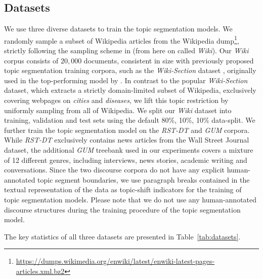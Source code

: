 \documentclass[letterpaper]{article} %
\begin{document}
\subsection{Datasets}
\label{sec:datasets}
We use three diverse datasets to train the topic segmentation models. We randomly sample a subset of Wikipedia articles from the Wikipedia dump\footnote{\url{https://dumps.wikimedia.org/enwiki/latest/enwiki-latest-pages-articles.xml.bz2}}, strictly following the sampling scheme in \citet{koshorek-etal-2018-text} (from here on called \textit{Wiki}). Our \textit{Wiki} corpus consists of $20,000$ documents, consistent in size with previously proposed topic segmentation training corpora, such as the \textit{Wiki-Section} dataset \cite{arnold-etal-2019-sector}, originally used in the top-performing model by \citet{xing-etal-2020-improving}. In contrast to the popular \textit{Wiki-Section} dataset, which extracts a strictly domain-limited subset of Wikipedia, exclusively covering webpages on \textit{cities} and \textit{diseases}, we lift this topic restriction by uniformly sampling from all of Wikipedia. We split our \textit{Wiki} dataset into training, validation and test sets using the default 80\%, 10\%, 10\% data-split. We further train the topic segmentation model on the \textit{RST-DT} \cite{carlson2002rst} and \textit{GUM} \cite{Zeldes2017} corpora. While \textit{RST-DT} exclusively contains news articles from the Wall Street Journal dataset, the additional \textit{GUM} treebank used in our experiments covers a mixture of 12 different genres, including interviews, news stories, academic writing and conversations. Since the two discourse corpora do not have any explicit human-annotated topic segment boundaries, we use paragraph breaks contained in the textual representation of the data as topic-shift indicators for the training of topic segmentation models. Please note that we do not use any human-annotated discourse structures during the training procedure of the topic segmentation model.

The key statistics of all three datasets are presented in Table~\ref{tab:datasets}.
\end{document}
